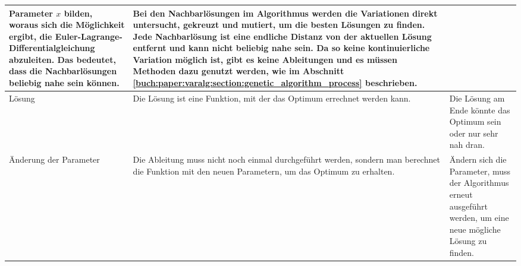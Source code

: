 \begin{xltabular}{\textwidth}{|L|X|X|}
   Parameter \(x\) bilden, woraus sich die Möglichkeit ergibt, die Euler-Lagrange-Differentialgleichung
   abzuleiten. Das bedeutet, dass die Nachbarlösungen beliebig nahe sein können.  
   & 
   Bei den Nachbarlösungen im Algorithmus werden die Variationen direkt untersucht,
   gekreuzt und mutiert, um die besten Lösungen zu finden. Jede Nachbarlösung 
   ist eine endliche Distanz von der aktuellen Lösung entfernt und kann nicht beliebig 
   nahe sein. Da so keine kontinuierliche Variation möglich ist, gibt es keine Ableitungen
   und es müssen Methoden dazu genutzt werden, wie im Abschnitt 
   \ref{buch:paper:varalg:section:genetic_algorithm_process} beschrieben.
   \\ \hline
   Lösung
   & 
   Die Lösung ist eine Funktion, mit der das Optimum errechnet werden kann.
   & 
   Die Lösung am Ende könnte das Optimum sein oder nur sehr nah dran.
   \\ \hline
   Änderung der Parameter
   & 
   Die Ableitung muss nicht noch einmal durchgeführt werden, sondern man berechnet die 
   Funktion mit den neuen Parametern, um das Optimum zu erhalten.
   & 
   Ändern sich die Parameter, muss der Algorithmus erneut ausgeführt werden, um eine
   neue mögliche Lösung zu finden.
   \\ \hline
\end{xltabular}